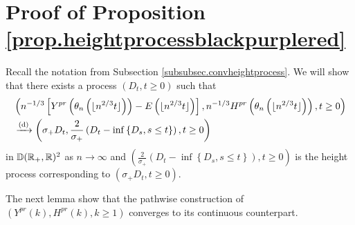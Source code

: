 \section{Proof of Proposition \ref{prop.heightprocessblackpurplered}}\label{appendix.heightprocessblackpurplered}
Recall the notation from Subsection \ref{subsubsec.convheightprocess}. We will show that there exists a process $(D_t,t\geq 0)$ such that 
\begin{align*}
    &\left(n^{-1/3}\left[Y^{pr}\left(\theta_n\left(\lfloor n^{2/3}t\rfloor \right)\right)-E\left(\lfloor n^{2/3}t\rfloor \right)\right], n^{-1/3}H^{pr}\left(\theta_n\left(\lfloor n^{2/3}t\rfloor \right)\right),t\geq 0\right)\\
    &\xrightarrow[]{\mathrm{(d)}}\left(\sigma_+D_t,\frac{2}{\sigma_+}\left(D_t-\inf\left\{D_s,s\leq t\right\}\right),t\geq 0\right)
\end{align*}
in ${\mathbb D}({\mathbb R}_+,{\mathbb R})^2$ as $n\to \infty$ and $\left(\frac{2}{\sigma_+}\left(D_t-\inf\left\{D_s,s\leq t\right\}\right),t\geq 0\right)$ is the height process corresponding to $(\sigma_+D_t,t\geq 0)$.

The next lemma show that the pathwise construction of $(Y^{pr}(k),H^{pr}(k),k\geq 1)$ converges to its continuous counterpart.

